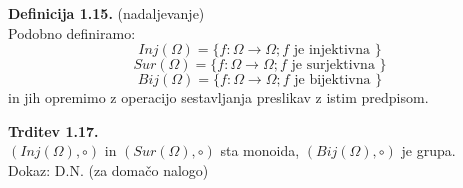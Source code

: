 \documentclass[12pt]{article}
\begin{document}
\vspace*{24pt}


\noindent
\textbf{Definicija 1.15.} (nadaljevanje) \\
Podobno definiramo: 
$$Inj(\Omega) = \{ f: \Omega \to \Omega ; f \text{ je injektivna }\}$$
$$Sur(\Omega) = \{ f: \Omega \to \Omega ; f \text{ je surjektivna } \}$$
$$Bij(\Omega) = \{ f: \Omega \to \Omega ; f \text{ je bijektivna } \}$$
in jih opremimo z operacijo sestavljanja preslikav z istim predpisom.



\vspace*{24pt}


\noindent
\textbf{Trditev 1.17.} \\
$(Inj(\Omega), \circ)$ in $(Sur(\Omega), \circ)$ sta monoida, $(Bij(\Omega), \circ)$ je grupa. \\[1em]
Dokaz: D.N. (za domačo nalogo)
\end{document}

